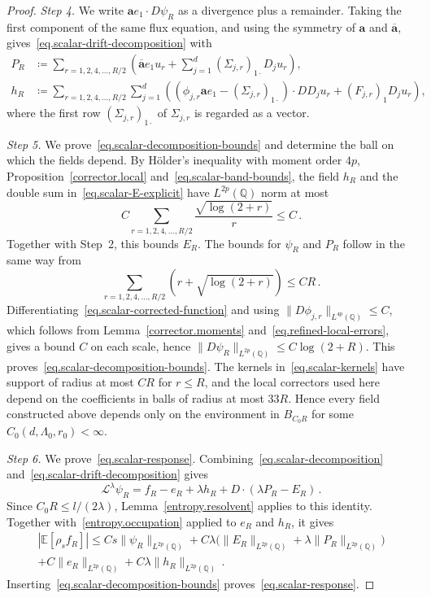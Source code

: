 \documentclass[11pt]{amsart}
\theoremstyle{definition}
\theoremstyle{remark}
\numberwithin{equation}{section}
\newcommand{\E}{\mathbb E}
\newcommand{\Q}{\mathbb Q}
\renewcommand{\a}{\mathbf a}
\newcommand{\ahom}{\overline{\mathbf a}}
\begin{document}
\begin{proof}
\emph{Step 4.} We write $\a e_1\cdot D\psi_R$ as a divergence plus a remainder. Taking the first component of the same flux equation, and using the symmetry of $\a$ and $\ahom$, gives~\eqref{eq.scalar-drift-decomposition} with
\begin{align}
 P_R&\coloneqq\sum_{r=1,2,4,\ldots,R/2}
 \left(\ahom e_1u_r+\sum_{j=1}^d(\Sigma_{j,r})_{1\cdot}D_ju_r\right),
 \label{eq.scalar-P-explicit}\\
 h_R&\coloneqq\sum_{r=1,2,4,\ldots,R/2}\sum_{j=1}^d
 \left((\phi_{j,r}\a e_1-(\Sigma_{j,r})_{1\cdot})\cdot D D_ju_r
       +(F_{j,r})_1D_ju_r\right),
 \label{eq.scalar-h-explicit}
\end{align}
where the first row $(\Sigma_{j,r})_{1\cdot}$ of $\Sigma_{j,r}$ is regarded as a vector.

\emph{Step 5.} We prove~\eqref{eq.scalar-decomposition-bounds} and determine the ball on which the fields depend. By H\"older's inequality with moment order $4p$, Proposition~\ref{corrector.local} and~\eqref{eq.scalar-band-bounds}, the field $h_R$ and the double sum in~\eqref{eq.scalar-E-explicit} have $L^{2p}(\Q)$ norm at most
\begin{equation*}
 C\sum_{r=1,2,4,\ldots,R/2}\frac{\sqrt{\log(2+r)}}r
 \leq C\, .
\end{equation*}
Together with Step~2, this bounds $E_R$. The bounds for $\psi_R$ and $P_R$ follow in the same way from
\begin{equation*}
 \sum_{r=1,2,4,\ldots,R/2}\left(r+\sqrt{\log(2+r)}\right)\leq CR\, .
\end{equation*}
Differentiating~\eqref{eq.scalar-corrected-function} and using $\|D\phi_{j,r}\|_{L^{4p}(\Q)}\leq C$, which follows from Lemma~\ref{corrector.moments} and~\eqref{eq.refined-local-errors}, gives a bound $C$ on each scale, hence $\|D\psi_R\|_{L^{2p}(\Q)}\leq C\log(2+R)$. This proves~\eqref{eq.scalar-decomposition-bounds}. The kernels in~\eqref{eq.scalar-kernels} have support of radius at most $CR$ for $r\leq R$, and the local correctors used here depend on the coefficients in balls of radius at most $33R$. Hence every field constructed above depends only on the environment in $B_{C_0R}$ for some $C_0(d,\Lambda_0,r_0)<\infty$.

\emph{Step 6.} We prove~\eqref{eq.scalar-response}. Combining~\eqref{eq.scalar-decomposition} and~\eqref{eq.scalar-drift-decomposition} gives
\begin{equation*}
 \mathcal L^\lambda\psi_R
 =f_R-e_R+\lambda h_R+D\cdot(\lambda P_R-E_R)\, .
\end{equation*}
Since $C_0R\leq l/(2\lambda)$, Lemma~\ref{entropy.resolvent} applies to this identity. Together with~\eqref{entropy.occupation} applied to $e_R$ and $h_R$, it gives
\begin{multline*}
 |\E[\rho_sf_R]|
 \leq Cs\|\psi_R\|_{L^{2p}(\Q)}
  +C\lambda\big(\|E_R\|_{L^{2p}(\Q)}+\lambda\|P_R\|_{L^{2p}(\Q)}\big)\\
  +C\|e_R\|_{L^{2p}(\Q)}+C\lambda\|h_R\|_{L^{2p}(\Q)}\, .
\end{multline*}
Inserting~\eqref{eq.scalar-decomposition-bounds} proves~\eqref{eq.scalar-response}.
\end{proof}
\end{document}
